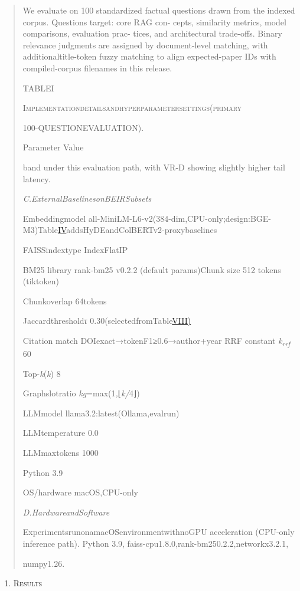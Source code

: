 \documentclass[
]{article}
\begin{document}
\begin{quote}
We evaluate on 100 standardized factual questions drawn from the indexed corpus. Questions target: core RAG con- cepts, similarity metrics, model comparisons, evaluation prac- tices, and architectural trade-offs. Binary relevance judgments are assigned by document-level matching, with additionaltitle-token fuzzy matching to align expected-paper IDs with compiled-corpus filenames in this release.

TABLEI

\textsc{Implementationdetailsandhyperparametersettings(primary}

100-QUESTIONEVALUATION).

Parameter Value

band under this evaluation path, with VR-D showing slightly higher tail latency.

\emph{C.ExternalBaselinesonBEIRSubsets}

Embeddingmodel all-MiniLM-L6-v2(384-dim,CPU-only;design:BGE-M3)Table\hyperref[_bookmark13]{IV}addsHyDEandColBERTv2-proxybaselines

FAISSindextype IndexFlatIP

BM25 library rank-bm25 v0.2.2 (default params)Chunk size 512 tokens (tiktoken)

Chunkoverlap 64tokens

Jaccardthreshold\emph{τ} 0.30(selectedfromTable\hyperref[_bookmark18]{VIII)}

Citation match DOIexact→tokenF1≥0.6→author+year RRF constant \emph{k\textsubscript{rrf}} 60

Top-\emph{k}(\emph{k}) 8

Graphslotratio \emph{kg}=max(1\emph{,}⌊\emph{k/}4⌋)

LLMmodel llama3.2:latest(Ollama,evalrun)

LLMtemperature 0.0

LLMmaxtokens 1000

Python 3.9

OS/hardware macOS,CPU-only

\emph{D.HardwareandSoftware}

ExperimentsrunonamacOSenvironmentwithnoGPU acceleration (CPU-only inference path). Python 3.9, faiss-cpu1.8.0,rank-bm250.2.2,networkx3.2.1,

numpy1.26.
\end{quote}

\begin{enumerate}
\def\labelenumi{\Roman{enumi}.}
\setcounter{enumi}{5}
\item
  \protect{}\label{Results}{}\textsc{Results}
\end{enumerate}
\end{document}
